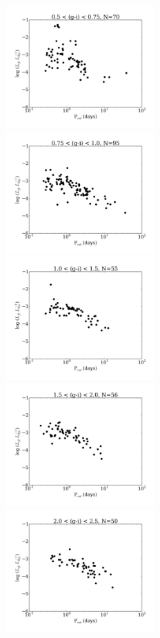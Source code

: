 \documentclass[twocolumn]{aastex6}
\begin{document}
\begin{figure}[!t]
\centering
\includegraphics[width=2.25in]{fig7a}
\includegraphics[width=2.25in]{fig7b}
\includegraphics[width=2.25in]{fig7c}\\
\includegraphics[width=2.25in]{fig7d}
\includegraphics[width=2.25in]{fig7e}

\end{figure}
\end{document}
